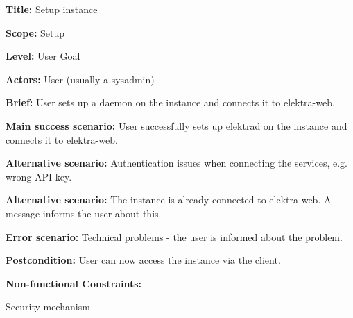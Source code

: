 
\begin{DoxyItemize}
\item {\bfseries Title\+:} Setup instance
\item {\bfseries Scope\+:} Setup
\item {\bfseries Level\+:} User Goal
\item {\bfseries Actors\+:} User (usually a sysadmin)
\item {\bfseries Brief\+:} User sets up a daemon on the instance and connects it to elektra-\/web.
\end{DoxyItemize}


\begin{DoxyItemize}
\item {\bfseries Main success scenario\+:} User successfully sets up elektrad on the instance and connects it to elektra-\/web.
\item {\bfseries Alternative scenario\+:} Authentication issues when connecting the services, e.\+g. wrong A\+PI key.
\item {\bfseries Alternative scenario\+:} The instance is already connected to elektra-\/web. A message informs the user about this.
\item {\bfseries Error scenario\+:} Technical problems -\/ the user is informed about the problem.
\item {\bfseries Postcondition\+:} User can now access the instance via the client.
\item {\bfseries Non-\/functional Constraints\+:}
\begin{DoxyItemize}
\item Security mechanism 
\end{DoxyItemize}
\end{DoxyItemize}